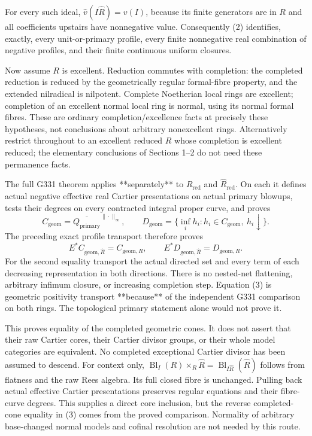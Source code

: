 \documentclass[11pt]{article}
\begin{document}
For every such ideal, $\widehat v(I\widehat R)=v(I)$, because its finite generators are in $R$ and all coefficients upstairs have nonnegative value. Consequently (2) identifies, exactly, every unit-or-primary profile, every finite nonnegative real combination of negative profiles, and their finite continuous uniform closures.

Now assume $R$ is excellent. Reduction commutes with completion: the completed reduction is reduced by the geometrically regular formal-fibre property, and the extended nilradical is nilpotent. Complete Noetherian local rings are excellent; completion of an excellent normal local ring is normal, using its normal formal fibres. These are ordinary completion/excellence facts at precisely these hypotheses, not conclusions about arbitrary nonexcellent rings. Alternatively restrict throughout to an excellent reduced $R$ whose completion is excellent reduced; the elementary conclusions of Sections 1--2 do not need these permanence facts.

The full G331 theorem applies **separately** to $R_{\mathrm{red}}$ and $\widehat R_{\mathrm{red}}$. On each it defines actual negative effective real Cartier presentations on actual primary blowups, tests their degrees on every contracted integral proper curve, and proves
\[
 C_{\mathrm{geom}}=\overline{Q_{\mathrm{primary}}}^{\|\cdot\|_\infty},
 \qquad D_{\mathrm{geom}}=\{\inf_i h_i:h_i\in C_{\mathrm{geom}},\ h_i\downarrow\}.
\]
The preceding exact profile transport therefore proves
\[
 E^*C_{\mathrm{geom},\widehat R}=C_{\mathrm{geom},R},\qquad
 E^*D_{\mathrm{geom},\widehat R}=D_{\mathrm{geom},R}. \tag{3}
\]
For the second equality transport the actual directed set and every term of each decreasing representation in both directions. There is no nested-net flattening, arbitrary infimum closure, or increasing completion step. Equation (3) is geometric positivity transport **because** of the independent G331 comparison on both rings. The topological primary statement alone would not prove it.

This proves equality of the completed geometric cones. It does not assert that their raw Cartier cores, their Cartier divisor groups, or their whole model categories are equivalent. No completed exceptional Cartier divisor has been assumed to descend. For context only, $\operatorname{Bl}_I(R)\times_R\widehat R=\operatorname{Bl}_{I\widehat R}(\widehat R)$ follows from flatness and the raw Rees algebra. Its full closed fibre is unchanged. Pulling back actual effective Cartier presentations preserves regular equations and their fibre-curve degrees. This supplies a direct core inclusion, but the reverse completed-cone equality in (3) comes from the proved comparison. Normality of arbitrary base-changed normal models and cofinal resolution are not needed by this route.
\end{document}
